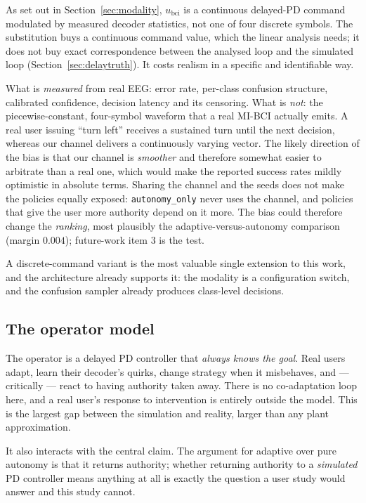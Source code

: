 \documentclass[11pt,a4paper]{article}
\newcommand{\vauto}{\texttt{autonomy\_only}}
\newcommand{\ubci}{u_{\mathrm{bci}}}
\theoremstyle{plain}
\theoremstyle{definition}
\begin{document}
As set out in Section~\ref{sec:modality}, $\ubci$ is a continuous
delayed-PD command modulated by measured decoder statistics, not one of
four discrete symbols. The substitution buys a continuous command
value, which the linear analysis needs; it does not buy exact
correspondence between the analysed loop and the simulated loop
(Section~\ref{sec:delaytruth}). It costs realism in a specific and
identifiable way.

What is \emph{measured} from real EEG: error rate, per-class confusion
structure, calibrated confidence, decision latency and its censoring.
What is \emph{not}: the piecewise-constant, four-symbol waveform that a
real MI-BCI actually emits. A real user issuing ``turn left'' receives a
sustained turn until the next decision, whereas our channel delivers a
continuously varying vector. The likely direction of the bias is that
our channel is \emph{smoother} and therefore somewhat easier to arbitrate
than a real one, which would make the reported success rates mildly
optimistic in absolute terms. Sharing the channel and the seeds does not
make the policies equally exposed: \vauto{} never uses the channel,
and policies that give the user more authority depend on it more. The
bias could therefore change the \emph{ranking}, most plausibly the
adaptive-versus-autonomy comparison (margin $0.004$); future-work item 3
is the test.

A discrete-command variant is the most valuable single extension to this
work, and the architecture already supports it: the modality is a
configuration switch, and the confusion sampler already produces
class-level decisions.

\subsection{The operator model}
\label{sec:operatorlimits}

The operator is a delayed PD controller that \emph{always knows the
goal}. Real users adapt, learn their decoder's quirks, change strategy
when it misbehaves, and --- critically --- react to having authority
taken away. There is no co-adaptation loop here, and a real user's
response to intervention is entirely outside the model. This is the
largest gap between the simulation and reality, larger than any plant
approximation.

It also interacts with the central claim. The argument for adaptive over
pure autonomy is that it returns authority; whether returning authority
to a \emph{simulated} PD controller means anything at all is exactly the
question a user study would answer and this study cannot.
\end{document}
